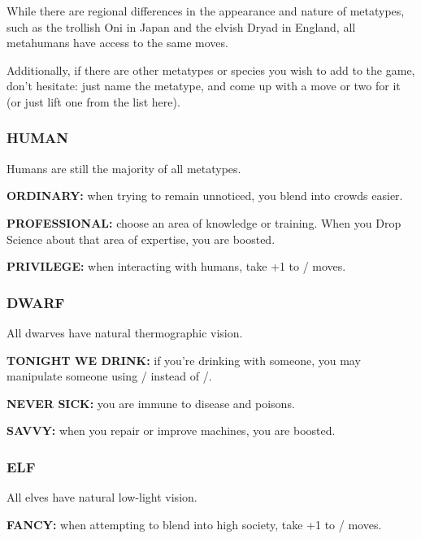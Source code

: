 \documentclass[oneside,10pt]{article}
\begin{document}
\begin{multicols}{2}
While there are regional differences in the appearance and
nature of metatypes, such as the trollish Oni in Japan and the
elvish Dryad in England, all metahumans have access to the
same moves.

Additionally, if there are other metatypes or species you wish
to add to the game, don’t hesitate: just name the metatype,
and come up with a move or two for it (or just lift one from
the list here).


\subsubsection{HUMAN}
\label{metatype_human}

Humans are still the majority of all metatypes.

\begin{dent}

\textbf{ORDINARY:} when trying to remain unnoticed, you blend into
crowds easier.

\textbf{PROFESSIONAL:} choose an area of knowledge or training.
When you Drop Science about that area of expertise, you
are boosted.

\textbf{PRIVILEGE:} when interacting with humans, take +1 to \flair/ moves.
\end{dent}

\subsubsection{DWARF}
\label{metatype_dwarf}
All dwarves have natural thermographic vision.

\begin{dent}

\textbf{TONIGHT WE DRINK:} if you’re drinking with someone, you
may manipulate someone using \oomph/ instead of
\flair/.

\textbf{NEVER SICK:} you are immune to disease and
poisons.

\textbf{SAVVY:} when you repair or improve machines, you are
boosted.
\end{dent}

\subsubsection{ELF}
\label{metatype_elf}
All elves have natural low-light vision.

\begin{dent}

\textbf{FANCY:} when attempting to blend into high society, take +1 to
\flair/ moves.
  

\end{dent}
\end{multicols}
\end{document}
